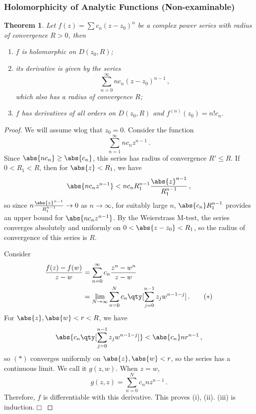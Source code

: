 \documentclass{article}
\theoremstyle{plain}\theoremheaderfont{\normalfont\itshape}\theorembodyfont{\rmfamily}\theoremseparator{.}\newtheorem*{rem}{Remark}\newtheorem*{ex}{Example}\newtheorem*{proof}{Proof}\newtheorem*{altp}{Alternative proof}
\theoremstyle{plain}\theoremheaderfont{\normalfont\bfseries}\theorembodyfont{\rmfamily}\theoremseparator{.}\newtheorem{thm}{Theorem}[section]\newtheorem{lem}[thm]{Lemma}\newtheorem{prop}[thm]{Proposition}\newtheorem*{cor}{Corollary}\newtheorem{defn}[thm]{Definition}\newtheorem{clm}[thm]{Claim}\newtheorem{clminproof}{Claim}
\theoremstyle{break}\theoremheaderfont{\normalfont\itshape}\theorembodyfont{\rmfamily}\theoremseparator{.\medskip}\newtheorem*{proofskip}{Proof}\newtheorem*{exs}{Examples}\newtheorem*{rems}{Remarks}
\theoremstyle{break}\theoremheaderfont{\normalfont\bfseries}\theorembodyfont{\rmfamily}\theoremseparator{.\medskip}\newtheorem{lemskip}[thm]{Lemma}\newtheorem{defnskip}[thm]{Definition}\newtheorem{propskip}[thm]{Proposition}\newtheorem{thmskip}[thm]{Theorem}
\numberwithin{equation}{section}
\newcommand{\qed}{\hfill\ensuremath{\Box}}
\begin{document}
	\subsubsection{Holomorphicity of Analytic Functions (Non-examinable)}
	\begin{thm}\label{anahol}
		Let \(f(z)=\sum c_n(z-z_0)^n\) be a complex power series with radius of convergence \(R>0\), then
		\begin{enumerate}[topsep=0pt]
			\item \(f\) is holomorphic on \(D(z_0,R)\);
			\item its derivative is given by the series
			\[\sum_{n=0}^{\infty}nc_n(z-z_0)^{n-1}\,,\]
			which also has a radius of convergence \(R\);
			\item \(f\) has derivatives of all orders on \(D(z_0,R)\) and \(f^{(n)}(z_0)=n!c_n\).
		\end{enumerate}
	\end{thm}
	\begin{proof}
		We will assume wlog that \(z_0=0\). Consider the function
		\[\sum_{n=1}^{\infty}nc_nz^{n-1}\,.\]
		Since \(\abs{nc_n}\ge\abs{c_n}\), this series has radius of convergence \(R'\le R\). If \(0<R_1<R\), then for \(\abs{z}<R_1\), we have
		\[\abs{nc_nz^{n-1}}<nc_nR_1^{n-1}\frac{\abs{z}^{n-1}}{R_1^{n-1}}\,,\]
		so since \(n\frac{\abs{z}^{n-1}}{R_1^{n-1}}\to 0\) as \(n\to\infty\), for suitably large \(n\), \(\abs{c_n}R_1^{n-1}\) provides an upper bound for \(\abs{nc_nz^{n-1}}\). By the Weierstrass M-test, the series converges absolutely and uniformly on \(0<\abs{z-z_0}<R_1\), so the radius of convergence of this series is \(R\).

		Consider
		\begin{align}
			\frac{f(z)-f(w)}{z-w}&=\sum_{n=0}^{\infty}c_n\frac{z^n-w^n}{z-w}\nonumber\\
			&=\lim_{N\to\infty}\sum_{n=0}^{N}c_n\qty[\sum_{j=0}^{n-1}z_jw^{n-1-j}]\,. \tag{\(*\)}
		\end{align}
		For \(\abs{z},\abs{w}<r<R\), we have
		\[\abs{c_n\qty[\sum_{j=0}^{n-1}z_jw^{n-1-j}]}<\abs{c_n}nr^{n-1}\,,\]
		so \((*)\) converges uniformly on \(\abs{z},\abs{w}<r\), so the series has a continuous limit. We call it \(g(z,w)\). When \(z=w\),
		\[g(z,z)=\sum_{n=0}^{N}c_nnz^{n-1}\,.\]
		Therefore, \(f\) is differentiable with this derivative. This proves (i), (ii). (iii) is induction.\qed
	\end{proof}
\end{document}
